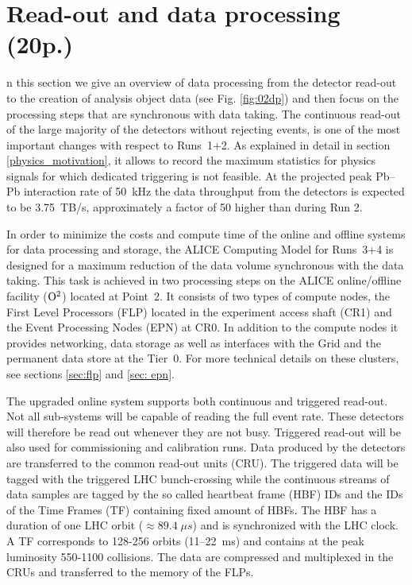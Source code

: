 \section{Read-out and data processing (20p.)}
n this section we give an overview of data processing from the detector read-out to the creation of analysis object data (see Fig. \ref{fig:02dp})
and then
focus on the processing steps that are synchronous with data taking.
The continuous read-out of the large majority of the detectors without rejecting 
events, is one of the most important changes with respect to Runs~1+2. As explained in 
detail in section \ref{physics_motivation}, it allows to 
record the maximum statistics for physics signals for which dedicated triggering is 
not feasible. At the projected peak Pb--Pb interaction rate of 50~kHz the data throughput from the detectors is expected to be {\color{blue} 3.75~TB/s}, approximately a factor of 50 higher than during Run 2.

In order to minimize the costs and compute time of the online and offline systems
for data processing and storage, the ALICE Computing Model for Runs~3+4 is designed 
for a maximum reduction of the data volume synchronous with the data taking. 
This task is achieved in two processing steps on the ALICE online/offline facility (${\rm O}^2$) located at Point~2.
It consists of two types of compute nodes, the First Level Processors (FLP) located in
the experiment access shaft (CR1) and the Event Processing Nodes (EPN) at CR0. In
addition to the compute
nodes it provides networking, data storage as well as interfaces with the Grid and the
permanent data
store at the Tier~0. For more technical details on these clusters, see sections
\ref{sec:flp} and \ref{sec: epn}.

The upgraded online system supports both continuous and triggered read-out. Not
all sub-systems will be capable of reading the full event rate. These detectors will
therefore be read out whenever they are not busy. Triggered read-out will be also used for commissioning and calibration runs. Data produced by the detectors are transferred to the common read-out units (CRU). The triggered data will be tagged with the triggered LHC bunch-crossing while the continuous streams of data samples are tagged by the so called heartbeat frame (HBF) IDs and the IDs of the Time Frames (TF) containing fixed amount of HBFs.
The HBF has a duration of one LHC orbit ($\approx 89.4\; \mu s$) and is synchronized with the LHC clock. A TF corresponds to 128-256 orbits (11--22~ms) and contains at the peak luminosity 550-1100 collisions.
The data are compressed and multiplexed
in the CRUs and transferred to the memory of the FLPs.

